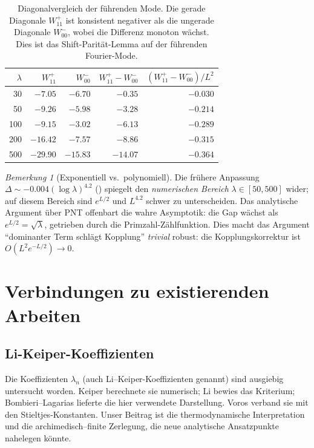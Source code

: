 \documentclass[12pt,a4paper]{article}
\theoremstyle{definition}
\theoremstyle{remark}
\newtheorem{remark}[theorem]{Bemerkung}
\begin{document}
\begin{table}[h]
\centering
\small
\renewcommand{\arraystretch}{1.15}
\begin{tabular}{r|r|r|r|r}
$\lambda$ & $W_{11}^+$ & $W_{00}^-$ & $W_{11}^+\! -\! W_{00}^-$ & $(W_{11}^+\! -\! W_{00}^-)/L^2$ \\\hline
30  & $-7.05$  & $-6.70$  & $-0.35$ & $-0.030$ \\
50  & $-9.26$  & $-5.98$  & $-3.28$ & $-0.214$ \\
100 & $-9.15$  & $-3.02$  & $-6.13$ & $-0.289$ \\
200 & $-16.42$ & $-7.57$  & $-8.86$ & $-0.315$ \\
500 & $-29.90$ & $-15.83$ & $-14.07$ & $-0.364$
\end{tabular}
\caption{Diagonalvergleich der führenden Mode. Die gerade Diagonale $W_{11}^+$ ist konsistent negativer als die ungerade Diagonale $W_{00}^-$, wobei die Differenz monoton wächst. Dies ist das Shift-Parität-Lemma auf der führenden Fourier-Mode.}
\label{tab:leading-mode}
\end{table}

\begin{remark}[Exponentiell vs.\ polynomiell]
Die frühere Anpassung $\Delta \sim -0.004 (\log\lambda)^{4.2}$ () spiegelt den \emph{numerischen Bereich} $\lambda \in [50, 500]$ wider; auf diesem Bereich sind $e^{L/2}$ und $L^{4.2}$ schwer zu unterscheiden. Das analytische Argument über PNT offenbart die wahre Asymptotik: die Gap wächst als $e^{L/2} = \sqrt{\lambda}$, getrieben durch die Primzahl-Zählfunktion. Dies macht das Argument ``dominanter Term schlägt Kopplung'' \emph{trivial} robust: die Kopplungskorrektur ist $O(L^2 e^{-L/2}) \to 0$.
\end{remark}


\section{Verbindungen zu existierenden Arbeiten}

\subsection{Li-Keiper-Koeffizienten}
Die Koeffizienten $\lambda_n$ (auch Li--Keiper-Koeffizienten genannt) sind ausgiebig untersucht worden. Keiper \cite{Keiper1992} berechnete sie numerisch; Li \cite{Li1997} bewies das Kriterium; Bombieri--Lagarias \cite{BombieriLagarias1999} lieferte die hier verwendete Darstellung. Voros \cite{Voros2004} verband sie mit den Stieltjes-Konstanten. Unser Beitrag ist die thermodynamische Interpretation und die archimedisch--finite Zerlegung, die neue analytische Ansatzpunkte nahelegen könnte.
\end{document}
